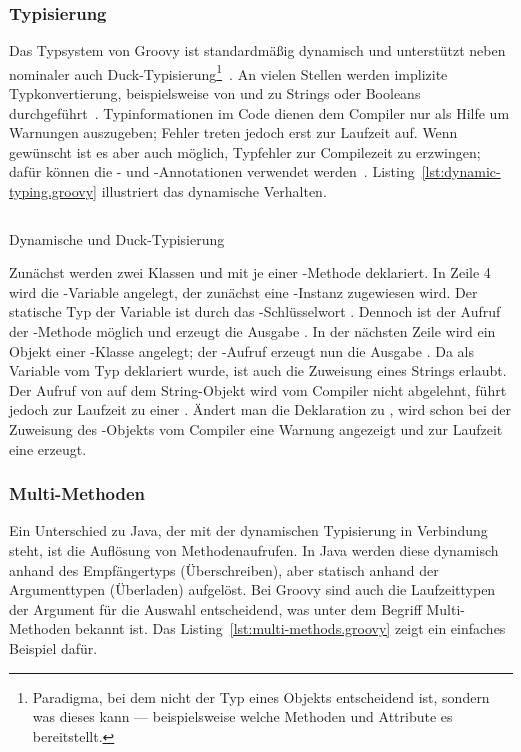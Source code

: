\documentclass[a4paper]{article}
\newcommand{\codelisting}[3]{
\begin{listing}[ht]
	\inputminted{#1}{#1/#2}
	\vspace{-3ex}
	\caption{#3}
	\label{lst:#2}
\end{listing}
}
\begin{document}
\subsubsection{Typisierung}\label{subsubsec:typisierung}

Das Typsystem von Groovy ist standardmäßig dynamisch und unterstützt neben nominaler auch Duck-Typisierung\footnote{Paradigma, bei dem nicht der Typ eines Objekts entscheidend ist, sondern was dieses kann --- beispielsweise welche Methoden und Attribute es bereitstellt.}~\cite[Abs.~6.]{groovy-lang:semantics}.
An vielen Stellen werden implizite Typkonvertierung, beispielsweise von und zu Strings oder Booleans durchgeführt~\cite[Abs.~3.]{groovy-lang:semantics}.
Typinformationen im Code dienen dem Compiler nur als Hilfe um Warnungen auszugeben; Fehler treten jedoch erst zur Laufzeit auf.
Wenn gewünscht ist es aber auch möglich, Typfehler zur Compilezeit zu erzwingen; dafür können die - und -Annotationen verwendet werden~\cite[Abs.~6.2.]{groovy-lang:semantics}.
Listing~\ref{lst:dynamic-typing.groovy} illustriert das dynamische Verhalten.

\codelisting{groovy}{dynamic-typing.groovy}{Dynamische und Duck-Typisierung}

Zunächst werden zwei Klassen  und  mit je einer -Methode deklariert.
In Zeile 4 wird die -Variable angelegt, der zunächst eine -Instanz zugewiesen wird.
Der statische Typ der Variable ist durch das -Schlüsselwort .
Dennoch ist der Aufruf der -Methode möglich und erzeugt die Ausgabe .
In der nächsten Zeile wird ein Objekt einer -Klasse angelegt; der -Aufruf erzeugt nun die Ausgabe .
Da  als Variable vom Typ  deklariert wurde, ist auch die Zuweisung eines Strings erlaubt.
Der Aufruf von  auf dem String-Objekt wird vom Compiler nicht abgelehnt, führt jedoch zur Laufzeit zu einer .
Ändert man die Deklaration zu , wird schon bei der Zuweisung des -Objekts vom Compiler eine Warnung angezeigt und zur Laufzeit eine  erzeugt.

\subsubsection{Multi-Methoden}

Ein Unterschied zu Java, der mit der dynamischen Typisierung in Verbindung steht, ist die Auflösung von Methodenaufrufen.
In Java werden diese dynamisch anhand des Empfängertyps (Überschreiben), aber statisch anhand der Argumenttypen (Überladen) aufgelöst.
Bei Groovy sind auch die Laufzeittypen der Argument für die Auswahl entscheidend, was unter dem Begriff Multi-Methoden bekannt ist.
Das Listing~\ref{lst:multi-methods.groovy} zeigt ein einfaches Beispiel dafür.
\end{document}
